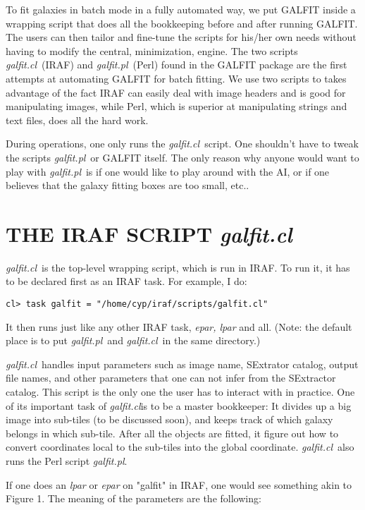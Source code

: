 \documentclass[preprint]{aastex}
\def\galfitcl{{\it galfit.cl}}
\def\galfitpl{{\it galfit.pl}}
\begin{document}
To fit galaxies in batch mode in a fully automated way, we put GALFIT inside a
wrapping script that does all the bookkeeping before and after running GALFIT.
The users can then tailor and fine-tune the scripts for his/her own needs
without having to modify the central, minimization, engine.  The two scripts
\galfitcl\ (IRAF) and \galfitpl\ (Perl) found in the GALFIT package are the
first attempts at automating GALFIT for batch fitting.  We use two scripts to
takes advantage of the fact IRAF can easily deal with image headers and is
good for manipulating images, while Perl, which is superior at manipulating
strings and text files, does all the hard work.

During operations, one only runs the \galfitcl\ script.  One shouldn't have to
tweak the scripts \galfitpl\ or GALFIT itself.  The only reason why anyone
would want to play with \galfitpl\ is if one would like to play around with
the AI, or if one believes that the galaxy fitting boxes are too small, etc..


\section {THE IRAF SCRIPT {\it galfit.cl}}

\galfitcl\  is the top-level wrapping script, which is run in IRAF.  To
run it, it has to be declared first as an IRAF task.  For example, I do:

\footnotesize
\begin{verbatim}
cl> task galfit = "/home/cyp/iraf/scripts/galfit.cl"
\end{verbatim}
\normalsize

\noindent It then runs just like any other IRAF task, {\it epar, lpar} and
all.  (Note:  the default place is to put \galfitpl\  and \galfitcl\  in
the same directory.)

\galfitcl\ handles input parameters such as image name, SExtrator catalog,
output file names, and other parameters that one can not infer from the
SExtractor catalog.  This script is the only one the user has to interact with
in practice.  One of its important task of \galfitcl is to be a master
bookkeeper:  It divides up a big image into sub-tiles (to be discussed soon),
and keeps track of which galaxy belongs in which sub-tile.  After all the
objects are fitted, it figure out how to convert coordinates local to the
sub-tiles into the global coordinate.  \galfitcl\ also runs the Perl script
\galfitpl.

If one does an {\it lpar} or {\it epar} on "galfit" in IRAF, one would see
something akin to Figure 1.  The meaning of the parameters are the following:
\end{document}
